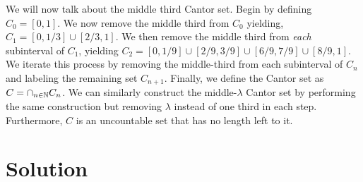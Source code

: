 \documentclass[notitlepage]{simple}
\begin{document}
	We will now talk about the middle third Cantor set.
	Begin by defining $C_0=[0,1]$.
	We now remove the middle third from $C_0$ yielding, $C_1=[0,1/3]\cup[2/3,1]$.
	We then remove the middle third from \textit{each} subinterval of $C_1$, yielding $C_2 = [0,1/9]\cup[2/9,3/9]\cup [6/9,7/9]\cup[8/9,1]$.
	We iterate this process by removing the middle-third from each subinterval of $C_n$ and labeling the remaining set $C_{n+1}$.
	Finally, we define the Cantor set as $C=\cap_{n\in\mathbb{N}} C_n$.
	We can similarly construct the middle-$\lambda$ Cantor set by performing the same construction but removing $\lambda$ instead of one third in each step.
	Furthermore, $C$ is an uncountable set that has no length left to it.

	\section{Solution}
\end{document}
